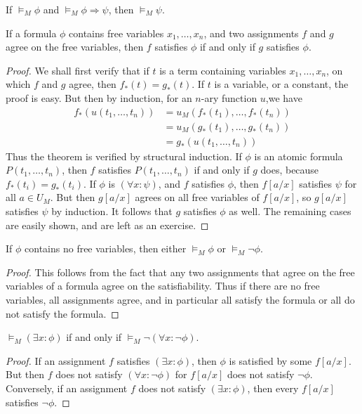 \begin{lemma} If $\vDash_M \phi$ and $\vDash_M \phi \Rightarrow \psi$, then $\vDash_M \psi$. \end{lemma}

\begin{lemma} If a formula $\phi$ contains free variables $x_1, \dots, x_n$, and two assignments $f$ and $g$ agree on the free variables, then $f$ satisfies $\phi$ if and only if $g$ satisfies $\phi$. \end{lemma}
\begin{proof}
    We shall first verify that if $t$ is a term containing variables $x_1, \dots, x_n$, on which $f$ and $g$ agree, then $f_*(t) = g_*(t)$. If $t$ is a variable, or a constant, the proof is easy. But then by induction, for an $n$-ary function $u$,we have
    \begin{align*}
        f_*(u(t_1, \dots, t_n)) &= u_M(f_*(t_1), \dots, f_*(t_n))\\
        &= u_M(g_*(t_1), \dots, g_*(t_n))\\
        &= g_*(u(t_1, \dots, t_n))
    \end{align*}
    Thus the theorem is verified by structural induction. If $\phi$ is an atomic formula $P(t_1, \dots, t_n)$, then $f$ satisfies $P(t_1, \dots, t_n)$ if and only if $g$ does, because $f_*(t_i) = g_*(t_i)$. If $\phi$ is $(\forall x: \psi)$, and $f$ satisfies $\phi$, then $f[a/x]$ satisfies $\psi$ for all $a \in U_M$. But then $g[a/x]$ agrees on all free variables of $f[a/x]$, so $g[a/x]$ satisfies $\psi$ by induction. It follows that $g$ satisfies $\phi$ as well. The remaining cases are easily shown, and are left as an exercise.
\end{proof}

\begin{theorem}
    If $\phi$ contains no free variables, then either $\vDash_M \phi$ or $\vDash_M \neg \phi$.
\end{theorem}
\begin{proof}
    This follows from the fact that any two assignments that agree on the free variables of a formula agree on the satisfiability. Thus if there are no free variables, all assignments agree, and in particular all satisfy the formula or all do not satisfy the formula.
\end{proof}

\begin{lemma} $\vDash_M (\exists x: \phi)$ if and only if $\vDash_M \neg (\forall x: \neg \phi)$. \end{lemma}
\begin{proof}
    If an assignment $f$ satisfies $(\exists x: \phi)$, then $\phi$ is satisfied by some $f[a/x]$. But then $f$ does not satisfy $(\forall x: \neg \phi)$ for $f[a/x]$ does not satisfy $\neg \phi$. Conversely, if an assignment $f$ does not satisfy $(\exists x: \phi)$, then every $f[a/x]$ satisfies $\neg \phi$.
\end{proof}

